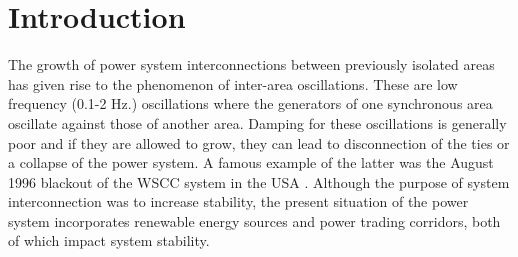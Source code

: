 \documentclass[conference]{IEEEtran}
\begin{document}
\begin{abstract}
\end{abstract}





%
\IEEEpeerreviewmaketitle

\section{Introduction}
The growth of power system interconnections between previously isolated areas has given rise to the phenomenon of inter-area oscillations. These are low frequency (0.1-2 Hz.) oscillations where the generators of one synchronous area oscillate against those of another area. Damping for these oscillations is generally poor and if they are allowed to grow, they can lead to disconnection of the ties or a collapse of the power system. A famous example of the latter was the August 1996 blackout of the WSCC system in the USA \cite{NAERC}. Although the purpose of system interconnection was to increase stability, the present situation of the power system incorporates renewable energy sources and power trading corridors, both of which impact system stability.
\end{document}
